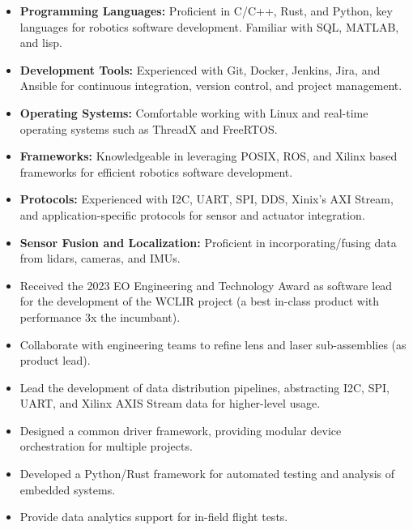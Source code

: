 \documentclass[a4paper,ragged2e,withhyper]{altacv}
\begin{document}
{
\label{sec:orgdad1287}
\begin{itemize}
\item \textbf{Programming Languages:} Proficient in C/C++, Rust, and Python, key languages for robotics software development. Familiar with SQL, MATLAB, and lisp.
\item \textbf{Development Tools:} Experienced with Git, Docker, Jenkins, Jira, and Ansible for continuous integration, version control, and project management.
\item \textbf{Operating Systems:} Comfortable working with Linux and real-time operating systems such as ThreadX and FreeRTOS.
\item \textbf{Frameworks:} Knowledgeable in leveraging POSIX, ROS, and Xilinx based frameworks for efficient robotics software development.
\item \textbf{Protocols:} Experienced with I2C, UART, SPI, DDS, Xinix's AXI Stream, and application-specific protocols for sensor and actuator integration.
\item \textbf{Sensor Fusion and Localization:} Proficient in incorporating/fusing data from lidars, cameras, and IMUs.
\end{itemize}
}
\label{sec:org7b8293c}


\begin{itemize}
\item Received the 2023 EO Engineering and Technology Award as software lead for the development of the WCLIR project (a best in-class product with performance 3x the incumbant).
\item Collaborate with engineering teams to refine lens and laser sub-assemblies (as product lead).
\item Lead the development of data distribution pipelines, abstracting I2C, SPI, UART, and Xilinx AXIS Stream data for higher-level usage.
\item Designed a common driver framework, providing modular device orchestration for multiple projects.
\item Developed a Python/Rust framework for automated testing and analysis of embedded systems.
\item Provide data analytics support for in-field flight tests.
\end{itemize}
\end{document}

